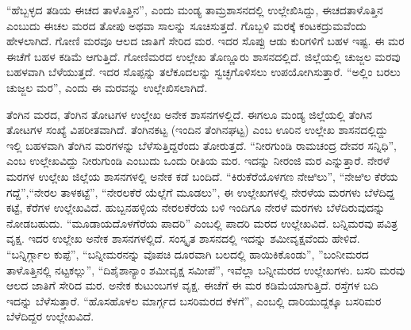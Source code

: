“ಹೆಬ್ಬಳ್ಳದ ತಡಿಯ ಈಚದ ತಾಳೊತ್ತಿನ”, ಎಂದು ಮಂಡ್ಯ ತಾಮ್ರಶಾಸನದಲ್ಲಿ ಉಲ್ಲೇಖಿಸಿದ್ದು, ಈಚದ\break ತಾಳೊತ್ತಿನ ಎಂಬುದು ಈಚಲ ಮರದ ತೋಪು ಅಥವಾ ಸಾಲನ್ನು ಸೂಚಿಸುತ್ತದೆ. ಗೊಬ್ಬಳಿ ಮರಕ್ಕೆ ಕಂಟಕದ್ರುಮವೆಂದು ಹೇಳಲಾಗಿದೆ. ಗೋಣಿ ಮರವೂ ಆಲದ ಜಾತಿಗೆ ಸೇರಿದ ಮರ. ಇದರ ಸೊಪ್ಪು ಆಡು ಕುರಿಗಳಿಗೆ ಬಹಳ ಇಷ್ಟ. ಈ ಮರ ಈಚೆಗೆ ಬಹಳ ಕಡಿಮೆ ಆಗುತ್ತಿದೆ. ಗೋಣಿಮರದ ಉಲ್ಲೇಖ ತೊಣ್ಣೂರು ಶಾಸನದಲ್ಲಿದೆ. ಜಿಲ್ಲೆಯಲ್ಲಿ ಚುಜ್ಜಲ ಮರವು ಬಹಳವಾಗಿ ಬೆಳೆಯುತ್ತದೆ. ಇದರ ಸೊಪ್ಪನ್ನು ತಲೆಕೂದಲನ್ನು ಸ್ವಚ್ಛಗೊಳಿಸಲು ಉಪಯೋಗಿಸುತ್ತಾರೆ. “ಅಲ್ಲಿಂ ಬರಲು ಚುಜ್ಜಲ ಮರ”, ಎಂದು ಈ ಮರವನ್ನು ಉಲ್ಲೇಖಿಸಲಾಗಿದೆ.

ತೆಂಗಿನ ಮರದ, ತೆಂಗಿನ ತೋಟಗಳ ಉಲ್ಲೇಖ ಅನೇಕ ಶಾಸನಗಳಲ್ಲಿದೆ. ಈಗಲೂ ಮಂಡ್ಯ ಜಿಲ್ಲೆಯಲ್ಲಿ ತೆಂಗಿನ ತೋಟಗಳ ಸಂಖ್ಯೆ ವಿಪರೀತವಾಗಿದೆ. ತೆಂಗಿನಕಟ್ಟ (ಇಂದಿನ ತೆಂಗಿನಘಟ್ಟ) ಎಂಬ ಊರಿನ ಉಲ್ಲೇಖ ಶಾಸನದಲ್ಲಿದ್ದು ಇಲ್ಲಿ ಬಹಳವಾಗಿ ತೆಂಗಿನ ಮರಗಳನ್ನು ಬೆಳೆಸುತ್ತಿದ್ದರೆಂದು ತೋರುತ್ತದೆ. “ನೀರಗುಂಡಿ ರಾಮಚಂದ್ರ ದೇವರ ಸನ್ನಿಧಿ”, ಎಂಬ ಉಲ್ಲೇಖವಿದ್ದು ನೀರುಗುಂಡಿ ಎಂಬುದು ಒಂದು ರೀತಿಯ ಮರ. ಇದನ್ನು ನೀರಂಜಿ ಮರ ಎನ್ನುತ್ತಾರೆ. ನೇರಳೆ ಮರಗಳ ಉಲ್ಲೇಖ ಜಿಲ್ಲೆಯ ಶಾಸನಗಳಲ್ಲಿ ಅನೇಕ ಕಡೆ ಬಂದಿದೆ. “ಕಿರುಕೆರೆಯೊಳಗಣ ನೇಱಿಲು”, “ನೇಱಿಲ ಕೆರೆಯ ಗದ್ದೆ”,\break “ನೇರಲ ತಾಳಕಟ್ಟೆ”, “ನೇರಲಕೆರೆ ಯೆಲ್ಲೆಗೆ ಮೂಡಲು”, ಈ ಉಲ್ಲೇಖಗಳಲ್ಲಿ ನೇರಳೆಯ ಮರಗಳು ಬೆಳೆದಿದ್ದ ಕಟ್ಟೆ, ಕೆರೆಗಳ ಉಲ್ಲೇಖವಿದೆ. ಹುಬ್ಬನಹಳ್ಳಿಯ ನೇರಲಕೆರೆಯ ಬಳಿ ಇಂದಿಗೂ ನೇರಳೆ ಮರಗಳು ಬೆಳೆದಿರುವುದನ್ನು ನೋಡಬಹುದು. “ಮೂಡಾಯ\-ದೊಳಗೆರೆಯ ಪಾದರಿ” ಎಂಬಲ್ಲಿ ಪಾದರಿ ಮರದ ಉಲ್ಲೇಖವಿದೆ. ಬನ್ನಿಮರವು ಪವಿತ್ರ ವೃಕ್ಷ. ಇದರ ಉಲ್ಲೇಖ ಅನೇಕ ಶಾಸನಗಳಲ್ಲಿದೆ. ಸಂಸ್ಕೃತ ಶಾಸನದಲ್ಲಿ ಇದನ್ನು ಶಮೀವೃಕ್ಷವೆಂದು ಹೇಳಿದೆ. “ಬನ್ನಿರ್ಗ್ಗಾಲ ಕುಪ್ಪೆ”, “ಬನ್ನೀಮರನನ್ನು ವೊಪಚಿ ದೂರವಾಗಿ ಬಲದಲ್ಲಿ ಹಾಯಿಕಿಕೊಂಡು”, ”ಬಂನೀಮರದ ತಾಳೊತ್ತಿನಲ್ಲಿ ನಟ್ಟಕಲ್ಲು”, “ದಿಶೈಶಾನ್ಯಾಂ ಶಮೀ\-ವೃಕ್ಷ ಸಮೀಪೆ”, ಇವೆಲ್ಲಾ ಬನ್ನೀಮರದ ಉಲ್ಲೇಖಗಳು. ಬಸರಿ ಮರವು ಆಲದ ಜಾತಿಗೆ ಸೇರಿದ ಮರ. ಅನೇಕ ಕುಟುಂಬಗಳ ವೃಕ್ಷ. ಈಚೆಗೆ ಈ ಮರ ಕಡಿಮೆಯಾಗುತ್ತಿದೆ. ರಸ್ತೆಗಳ ಬದಿ ಇದನ್ನು ಬೆಳೆಸುತ್ತಾರೆ. “ಹೊಸಹೊಳಲ ಮಾರ್ಗ್ಗದ ಬಸರಿಮರದ ಕೆಳಗೆ”, ಎಂಬಲ್ಲಿ ದಾರಿಯುದ್ದಕ್ಕೂ ಬಸರಿಮರ ಬೆಳೆದಿದ್ದರ ಉಲ್ಲೇಖವಿದೆ.

